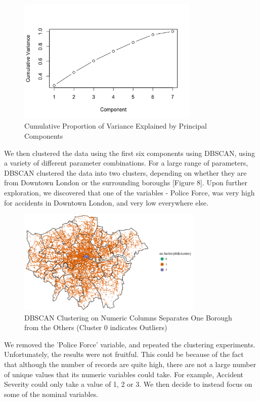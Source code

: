 \documentclass{neu_handout}
\begin{document}
\begin{figure}[!htb]
    \begin{center}
      \includegraphics[height=6cm,keepaspectratio]{pca.png}
      \caption{Cumulative Proportion of Variance Explained by Principal Components}
    \end{center}
 \end{figure}

We then clustered the data using the first six components using DBSCAN, using a variety of different parameter combinations. For a large range of parameters, DBSCAN clustered the data into two clusters, depending on whether they are from Downtown London or the surrounding boroughs [Figure 8]. Upon further exploration, we discovered that one of the variables - Police Force, was very high for accidents in Downtown London, and very low everywhere else. \\

\begin{figure}[!htb]
    \begin{center}
      \includegraphics[height=5cm, keepaspectratio]{db_1_county.png}
      \caption{DBSCAN Clustering on Numeric Columns Separates One Borough from the Others (Cluster 0 indicates Outliers)}
    \end{center}
\end{figure}

We removed the 'Police Force' variable, and repeated the clustering experiments. Unfortunately, the results were not fruitful. This could be because of the fact that although the number of records are quite high, there are not a large number of unique values that its numeric variables could take. For example, Accident Severity could only take a value of 1, 2 or 3. We then decide to instead focus on some of the nominal variables.
\end{document}
